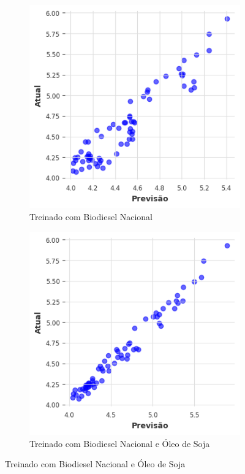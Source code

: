 \begin{figure}[htbp]
	\centering
	\begin{subfigure}[b]{0.40\textwidth}
		\centering
		\includegraphics[width=\textwidth]{figuras/mlp_takens_brasil_scatter.png} %
		\caption{Treinado com Biodiesel Nacional \newline}
		\label{fig:mlp_takens_brasil_scatter}
	\end{subfigure}
	\hfill
	\begin{subfigure}[b]{0.40\textwidth}
		\centering
		\includegraphics[width=\textwidth]{figuras/mlp_takens_brasil_oil_scatter.png} %
		\caption{Treinado com Biodiesel Nacional e Óleo de Soja}
		\label{fig:mlp_takens_brasil_oil_scatter}
	\end{subfigure}


\end{figure}
